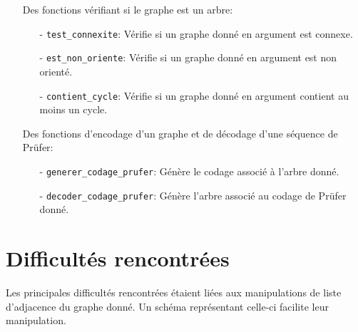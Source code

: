 \documentclass[a4paper, 11pt, oneside]{article}
\begin{document}
\begin{itemize}

\item[\textbullet] Des fonctions vérifiant si le graphe est un arbre:\\

\begin{itemize}

	\item[-] \texttt{test\_connexite}: Vérifie si un graphe donné en argument est connexe.
	
	\item[-] \texttt{est\_non\_oriente}: Vérifie si un graphe donné en argument est non orienté.

	\item[-] \texttt{contient\_cycle}: Vérifie si un graphe donné en argument contient au moins un cycle.\\

\end{itemize}

\item[\textbullet] Des fonctions d'encodage d'un graphe et de décodage d'une séquence de Prüfer:\\

\begin{itemize}

	\item[-] \texttt{generer\_codage\_prufer}: Génère le codage associé à l'arbre donné.
	
	\item[-] \texttt{decoder\_codage\_prufer}: Génère l'arbre associé au codage de Prüfer donné.

\end{itemize}

\end{itemize}

\section{Difficultés rencontrées}

Les principales difficultés rencontrées étaient liées aux manipulations de liste d'adjacence du graphe donné. Un schéma représentant celle-ci facilite leur manipulation.
\end{document}
